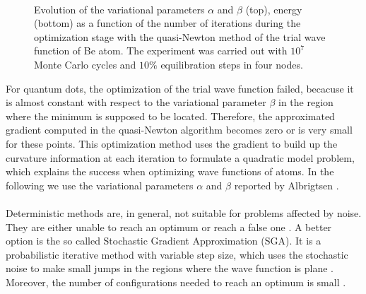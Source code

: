 \begin{figure}[!hbt]
\begin{center}
		\\
		\caption{Evolution of the variational parameters $\alpha$ and $\beta$ (top), energy (bottom) as a function of the number of iterations during the optimization stage with the quasi-Newton method of the trial wave function of Be atom. The experiment was carried out with $10^7$ Monte Carlo cycles and $10 \%$ equilibration steps in four nodes.}
		\label{quasiNewtonOptBe}
	\end{center}
\end{figure}

\noindent
For quantum dots, the optimization of the trial wave function failed, becacuse it is almost constant with respect to the variational parameter $\beta$ in the region where the minimum is supposed to be located. Therefore, the approximated gradient computed in the quasi-Newton algorithm becomes zero or is very small for these points.  This optimization method uses the gradient to build up the curvature information at each iteration to formulate a quadratic model problem, which explains the success when optimizing wave functions of atoms. In the following we use the variational parameters $\alpha$ and $\beta$ reported by Albrigtsen \cite{Albrigtsen}.\\
\\
Deterministic methods are, in general, not suitable for problems affected by noise. They are either unable to reach an optimum or reach a false one \cite{Harju1997}. A better option is the so called Stochastic Gradient Approximation (SGA). It is a probabilistic iterative method with variable step size, which uses the stochastic noise to make small jumps in the regions where the wave function is plane \cite{Harju1997,Albrigtsen}. Moreover, the number of configurations needed to reach an optimum is small \cite{siljamaki2003}.

